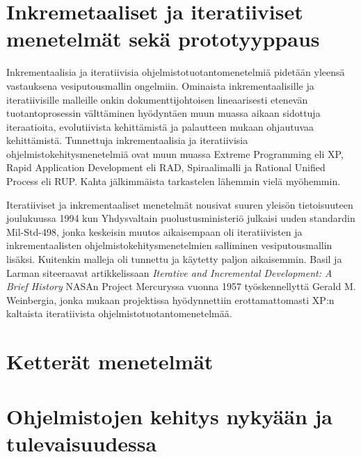 \documentclass[finnish,12pt]{tktltiki2}
\theoremstyle{definition}
\theoremstyle{remark}
\begin{document}
\section{Inkremetaaliset ja iteratiiviset menetelmät sekä prototyyppaus}

Inkrementaalisia ja iteratiivisia ohjelmistotuotantomenetelmiä pidetään yleensä vastauksena vesiputousmallin ongelmiin. Ominaista inkrementaalisille ja iteratiivisille malleille onkin dokumenttijohtoisen lineaarisesti etenevän tuotantoprosessin välttäminen hyödyntäen muun muassa aikaan sidottuja iteraatioita, evolutiivista kehittämistä ja palautteen mukaan ohjautuvaa kehittämistä. \cite{larman03}
Tunnettuja inkrementaalisia ja iteratiivisia ohjelmistokehitysmenetelmiä ovat muun muassa Extreme Programming eli XP, Rapid Application Development eli RAD, Spiraalimalli ja Rational Unified Process eli RUP. Kahta jälkimmäista tarkastelen lähemmin vielä myöhemmin.

Iteratiiviset ja inkrementaaliset menetelmät nousivat suuren yleisön tietoisuuteen joulukuussa 1994 kun Yhdysvaltain puolustusministeriö julkaisi uuden standardin Mil-Std-498, jonka keskeisin muutos aikaisempaan oli iteratiivisten ja inkrementaalisten ohjelmistokehitysmenetelmien salliminen vesiputousmallin lisäksi. Kuitenkin malleja oli tunnettu ja käytetty paljon aikaisemmin. Basil ja Larman siteeraavat artikkelissaan \textit{Iterative and Incremental Development: A Brief History} NASAn Project Mercuryssa vuonna 1957 työskennellyttä Gerald M. Weinbergia, jonka mukaan projektissa hyödynnettiin erottamattomasti XP:n kaltaista iteratiivista ohjelmistotuotantomenetelmää. 


\section{Ketterät menetelmät}
\section{Ohjelmistojen kehitys nykyään ja tulevaisuudessa}

%
%
% 
%







% 
\end{document}
